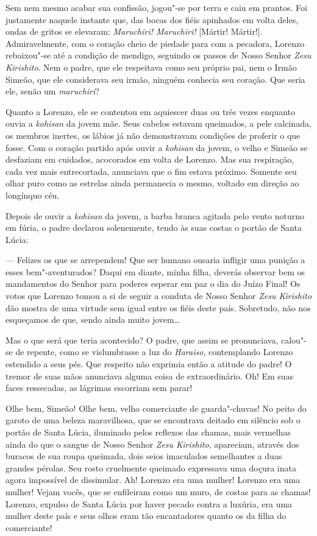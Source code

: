 Sem nem mesmo acabar sua confissão, jogou"-se por terra e caiu em
prantos. Foi justamente naquele instante que, das bocas dos fiéis apinhados em
volta deles, ondas de gritos se elevaram: \textit{Maruchiri!
Maruchiri!} [Mártir! Mártir!]. Admiravelmente, com o coração cheio de
piedade para com a pecadora, Lorenzo rebaixou"-se até a condição de
mendigo, seguindo os passos de Nosso Senhor \textit{Zesu Kirishito}.
Nem o padre, que ele respeitava como seu próprio pai, nem o Irmão
Simeão, que ele considerava seu irmão, ninguém conhecia seu coração.
Que seria ele, senão um \textit{maruchiri}? 

Quanto a Lorenzo, ele se contentou em aquiescer duas ou três vezes
enquanto ouvia a \textit{kohisan} da jovem mãe. Seus cabelos estavam
queimados, a pele calcinada, os membros inertes, os lábios já não
demonstravam condições de proferir o que fosse. Com o coração partido
após ouvir a \textit{kohisan} da jovem, o velho e Simeão se desfaziam
em cuidados, acocorados em volta de Lorenzo. Mas sua respiração, cada
vez mais entrecortada, anunciava que o fim estava próximo. Somente seu
olhar puro como as estrelas ainda permanecia o mesmo, voltado em
direção ao longínquo céu.

Depois de ouvir a \textit{kohisan} da jovem, a barba branca agitada pelo
vento noturno em fúria, o padre declarou solenemente, tendo às suas
costas o portão de Santa Lúcia:

--- Felizes os que se arrependem! Que ser humano ousaria infligir uma
punição a esses bem"-aventurados? Daqui em diante, minha filha, deverás
observar bem os mandamentos do Senhor para poderes esperar em paz o dia
do Juízo Final! Os votos que Lorenzo tomou a si de seguir a conduta de
Nosso Senhor \textit{Zesu Kirishito} dão mostra de uma virtude sem 
igual entre os fiéis deste país. Sobretudo, não nos esqueçamos de que,
sendo ainda muito jovem\ldots{}

Mas o que será que teria acontecido? O padre, que assim se pronunciava,
calou"-se de repente, como se vislumbrasse a luz do \textit{Haraiso},
contemplando Lorenzo estendido a seus pés. Que respeito não exprimia
então a atitude do padre! O tremor de suas mãos anunciava alguma coisa
de extraordinário. Oh! Em suas faces ressecadas, as lágrimas escorriam
sem parar!

Olhe bem, Simeão! Olhe bem, velho comerciante de guarda"-chuvas! No peito
do garoto de uma beleza maravilhosa, que se encontrava deitado em
silêncio sob o portão de Santa Lúcia, iluminado pelos reflexos das
chamas, mais vermelhas ainda do que o sangue de Nosso Senhor
\textit{Zesu Kirishito}, apareciam, através dos buracos de sua roupa
queimada, dois seios imaculados semelhantes a duas grandes pérolas. 
Seu rosto cruelmente queimado expressava uma doçura inata agora
impossível de dissimular. Ah! Lorenzo era uma mulher! Lorenzo era uma
mulher! Vejam vocês, que se enfileiram como um muro, de costas para as
chamas! Lorenzo, expulso de Santa Lúcia por haver pecado contra a
luxúria, era uma mulher deste país e seus olhos eram tão encantadores 
quanto os da filha do comerciante! 

